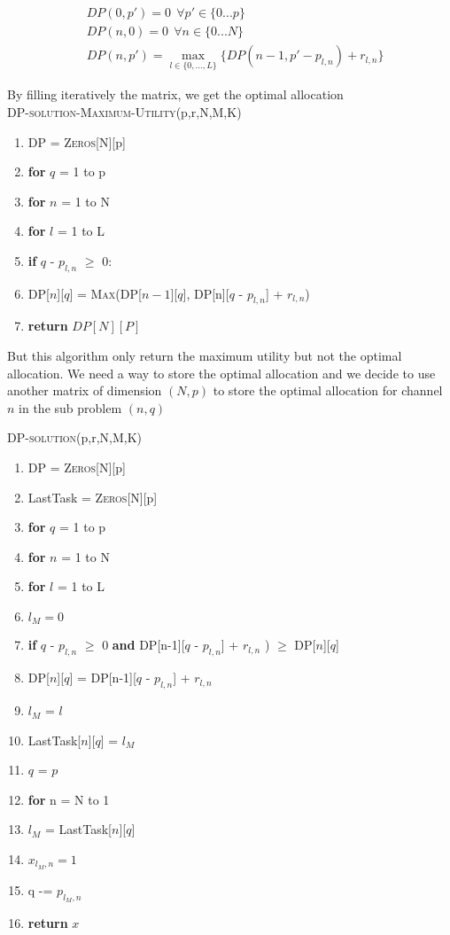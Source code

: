 \documentclass[11pt, oneside]{report}
\begin{document}
\begin{align*}
&DP(0,p') = 0 \ \  \forall p'\in \{0...p\} \\
&DP(n,0) = 0\ \ \forall n\in \{0...N\} \\
&DP(n,p') =  \max_{l \in \{0,...,L\}} \{ DP(n-1, p'-p_{l,n}) + r_{l,n} \}
\end{align*}

By filling iteratively the matrix, we get the optimal allocation\\

\noindent\textsc{DP-solution-Maximum-Utility}(p,r,N,M,K)
\begin{enumerate}[1\ ]
\setlength{\topsep}{0.05ex}
\setlength{\itemsep}{0.05ex}
\item DP = \textsc{Zeros}[N][p]
\item \textbf{for} $q$ = 1 to p
\item \qquad \textbf{for} $n$ = 1 to N
\item \qquad \qquad \textbf{for} $l$ = 1 to L
\item \qquad \qquad \qquad \textbf{if} $q$ - $p_{l,n}$ $\geq$ 0:
\item \qquad \qquad \qquad \qquad DP[$n$][$q$] = \textsc{Max}(DP[$n-1$][$q$], DP[n][$q$ - $p_{l,n}$] + $r_{l,n}$)
\item \textbf{return} $DP[N][P]$
\end{enumerate}

But this algorithm only return the maximum utility but not the optimal allocation. We need a way to store the optimal allocation and we decide to use another matrix of dimension $(N,p)$ to store the optimal allocation for channel $n$ in the sub problem $(n,q)$

\noindent\textsc{DP-solution}(p,r,N,M,K)
\begin{enumerate}[1\ ]
\setlength{\topsep}{0.05ex}
\setlength{\itemsep}{0.05ex}
\item DP = \textsc{Zeros}[N][p]
\item LastTask = \textsc{Zeros}[N][p]
\item \textbf{for} $q$ = 1 to p
\item \qquad \textbf{for} $n$ = 1 to N
\item \qquad \qquad \textbf{for} $l$ = 1 to L
\item \qquad \qquad \qquad $l_M = 0$
\item \qquad \qquad \qquad \textbf{if} $q$ - $p_{l,n}$ $\geq$ 0 \textbf{and} DP[n-1][$q$ - $p_{l,n}$] + $r_{l,n}$ ) $\geq$ DP[$n$][$q$]
\item \qquad \qquad \qquad \qquad DP[$n$][$q$] = DP[n-1][$q$ - $p_{l,n}$] + $r_{l,n}$
\item \qquad \qquad \qquad \qquad $l_M$ = $l$
\item \qquad \qquad LastTask[$n$][$q$] = $l_M$
\item $q$ = $p$
\item \textbf{for} n = N to 1
\item \qquad $l_M$ = LastTask[$n$][$q$]
\item \qquad $x_{l_M, n} = 1$
\item \qquad q -= $p_{l_M, n}$
\item \textbf{return} $x$
\end{enumerate}
\end{document}
